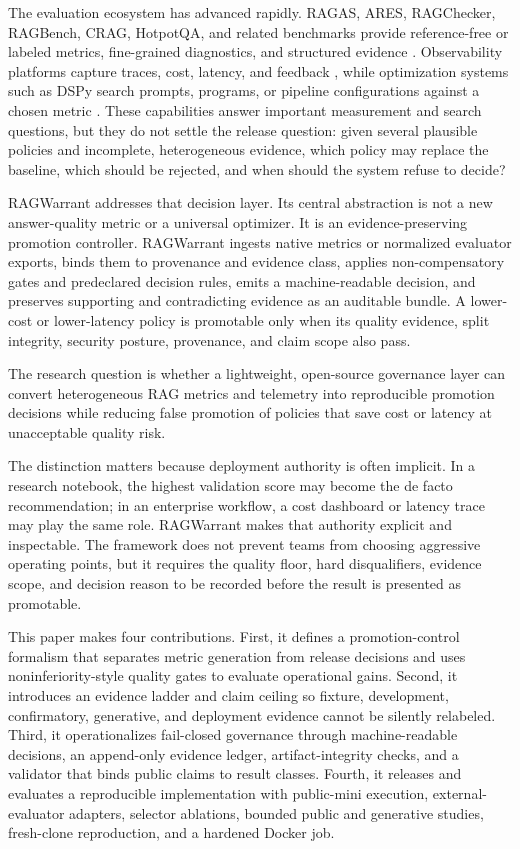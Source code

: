 \documentclass[11pt]{article}
\begin{document}
The evaluation ecosystem has advanced rapidly. RAGAS, ARES, RAGChecker, RAGBench, CRAG, HotpotQA, and related benchmarks provide reference-free or labeled metrics, fine-grained diagnostics, and structured evidence \cite{ref3,ref4,ref5,ref6,ref7,ref8,ref10}. Observability platforms capture traces, cost, latency, and feedback \cite{ref18,ref19}, while optimization systems such as DSPy search prompts, programs, or pipeline configurations against a chosen metric \cite{ref9}. These capabilities answer important measurement and search questions, but they do not settle the release question: given several plausible policies and incomplete, heterogeneous evidence, which policy may replace the baseline, which should be rejected, and when should the system refuse to decide?

RAGWarrant addresses that decision layer. Its central abstraction is not a new answer-quality metric or a universal optimizer. It is an evidence-preserving promotion controller. RAGWarrant ingests native metrics or normalized evaluator exports, binds them to provenance and evidence class, applies non-compensatory gates and predeclared decision rules, emits a machine-readable decision, and preserves supporting and contradicting evidence as an auditable bundle. A lower-cost or lower-latency policy is promotable only when its quality evidence, split integrity, security posture, provenance, and claim scope also pass.

The research question is whether a lightweight, open-source governance layer can convert heterogeneous RAG metrics and telemetry into reproducible promotion decisions while reducing false promotion of policies that save cost or latency at unacceptable quality risk.

The distinction matters because deployment authority is often implicit. In a research notebook, the highest validation score may become the de facto recommendation; in an enterprise workflow, a cost dashboard or latency trace may play the same role. RAGWarrant makes that authority explicit and inspectable. The framework does not prevent teams from choosing aggressive operating points, but it requires the quality floor, hard disqualifiers, evidence scope, and decision reason to be recorded before the result is presented as promotable.

This paper makes four contributions. First, it defines a promotion-control formalism that separates metric generation from release decisions and uses noninferiority-style quality gates to evaluate operational gains. Second, it introduces an evidence ladder and claim ceiling so fixture, development, confirmatory, generative, and deployment evidence cannot be silently relabeled. Third, it operationalizes fail-closed governance through machine-readable decisions, an append-only evidence ledger, artifact-integrity checks, and a validator that binds public claims to result classes. Fourth, it releases and evaluates a reproducible implementation with public-mini execution, external-evaluator adapters, selector ablations, bounded public and generative studies, fresh-clone reproduction, and a hardened Docker job.
\end{document}
